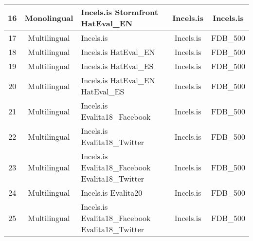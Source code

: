 \begin{tabular}{|c|c|p{3cm}|c|c|}
16 & Monolingual & Incels.is \newline Stormfront \newline HatEval\_EN & Incels.is & Incels.is \\ \hline
17 & Multilingual & Incels.is & Incels.is & FDB\_500 \\ \hline
18 & Multilingual & Incels.is \newline HatEval\_EN & Incels.is & FDB\_500 \\ \hline
19 & Multilingual & Incels.is \newline HatEval\_ES & Incels.is & FDB\_500 \\ \hline
20 & Multilingual & Incels.is \newline HatEval\_EN \newline HatEval\_ES & Incels.is & FDB\_500 \\ \hline
21 & Multilingual & Incels.is \newline Evalita18\_Facebook & Incels.is & FDB\_500 \\ \hline
22 & Multilingual & Incels.is \newline Evalita18\_Twitter & Incels.is & FDB\_500 \\ \hline
23 & Multilingual & Incels.is \newline Evalita18\_Facebook \newline Evalita18\_Twitter & Incels.is & FDB\_500 \\ \hline
24 & Multilingual & Incels.is \newline Evalita20 & Incels.is & FDB\_500 \\ \hline
25 & Multilingual & Incels.is \newline Evalita18\_Facebook \newline Evalita18\_Twitter & Incels.is & FDB\_500 \\ \hline
\end{tabular}